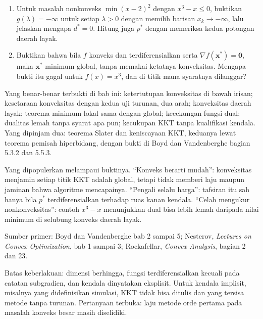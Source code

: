 \begin{latihan}
\begin{enumerate}
  \item Untuk masalah nonkonveks $\min (x-2)^{2}$ dengan $x^{3}-x\le0$, buktikan
        $g(\lambda)=-\infty$ untuk setiap $\lambda>0$ dengan memilih barisan
        $x_{k}\to-\infty$, lalu jelaskan mengapa $d^{*}=0$. Hitung juga $p^{*}$ dengan
        memeriksa kedua potongan daerah layak.

  \item Buktikan bahwa bila $f$ konveks dan terdiferensialkan serta
        $\nabla f(\mathbf{x}^{*})=\mathbf{0}$, maka $\mathbf{x}^{*}$ minimum global,
        tanpa memakai ketatnya konveksitas. Mengapa bukti itu gagal untuk $f(x)=x^{3}$,
        dan di titik mana syaratnya dilanggar?
\end{enumerate}
\end{latihan}

\begin{untukpeneliti}
Yang benar-benar terbukti di bab ini: ketertutupan konveksitas di bawah irisan; kesetaraan
konveksitas dengan kedua uji turunan, dua arah; konveksitas daerah layak; teorema minimum
lokal sama dengan global; kecekungan fungsi dual; dualitas lemah tanpa syarat apa pun;
kecukupan KKT tanpa kualifikasi kendala. Yang dipinjam dua: teorema Slater dan keniscayaan
KKT, keduanya lewat teorema pemisah hiperbidang, dengan bukti di Boyd dan Vandenberghe
bagian 5.3.2 dan 5.5.3.

Yang dipopulerkan melampaui buktinya. ``Konveks berarti mudah'': konveksitas menjamin
setiap titik KKT adalah global, tetapi tidak memberi laju maupun jaminan bahwa algoritme
mencapainya. ``Pengali selalu harga'': tafsiran itu sah hanya bila $p^{*}$
terdiferensialkan terhadap ruas kanan kendala. ``Celah mengukur nonkonveksitas'': contoh
$x^{3}-x$ menunjukkan dual bisa lebih lemah daripada nilai minimum di selubung konveks
daerah layak.

Sumber primer: Boyd dan Vandenberghe bab 2 sampai 5; Nesterov, \emph{Lectures on Convex
Optimization}, bab 1 sampai 3; Rockafellar, \emph{Convex Analysis}, bagian 2 dan 23.

Batas keberlakuan: dimensi berhingga, fungsi terdiferensialkan kecuali pada catatan
subgradien, dan kendala dinyatakan eksplisit. Untuk kendala implisit, misalnya yang
didefinisikan simulasi, KKT tidak bisa ditulis dan yang tersisa metode tanpa turunan.
Pertanyaan terbuka: laju metode orde pertama pada masalah konveks besar masih diselidiki.
\end{untukpeneliti}

